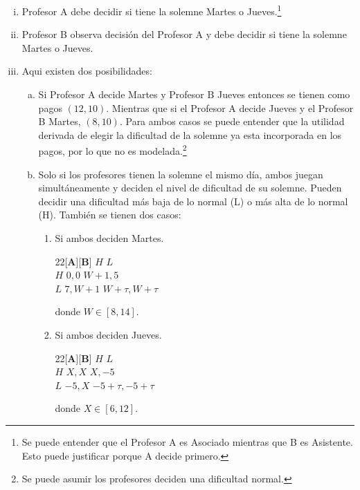 \documentclass[11pt]{article}
\begin{document}
\begin{enumerate}[(i)]
	\item Profesor A debe decidir si tiene la solemne Martes o Jueves.\footnote{Se puede entender que el Profesor A es Asociado mientras que B es Asistente. Esto puede justificar porque A decide primero.}
	\item Profesor B observa decisi\'on del Profesor A y debe decidir si tiene la solemne Martes o Jueves.
	\item Aqui existen dos posibilidades:
	\begin{enumerate}[(a)]
		\item Si Profesor A decide Martes y Profesor B Jueves entonces se tienen como pagos $(12,10)$. Mientras que si el Profesor A decide Jueves y el Profesor B Martes, $(8,10)$. Para ambos casos se puede entender que la utilidad derivada de elegir la dificultad de la solemne ya esta incorporada en los pagos, por lo que no es modelada.\footnote{Se puede asumir los profesores deciden una dificultad normal.}
		\item Solo si los profesores tienen la solemne el mismo d\'ia, ambos juegan simult\'aneamente y deciden el nivel de dificultad de su solemne. Pueden decidir una dificultad m\'as baja de lo normal (L) o m\'as alta de lo normal (H). Tambi\'en se tienen dos casos:
		\begin{enumerate}[{(iii, b)} (a)]
			\item Si ambos deciden Martes.
			\begin{center}
 				\begin{game}{2}{2}[\textbf{A}][\textbf{B}]
                  				\>$H$         \>$L$\\
        			$H$       \>$0,0$       \>$W+1,5$\\
        			$L$       \>$7,W+1$       \>$W+\tau,W+\tau$
				\end{game}
			\end{center} donde $W \in [8,14]$.
			\item Si ambos deciden Jueves.
			\begin{center}
 				\begin{game}{2}{2}[\textbf{A}][\textbf{B}]
                  				\>$H$         \>$L$\\
        			$H$       \>$X,X$       \>$X,-5$\\
        			$L$       \>$-5,X$       \>$-5+\tau,-5+\tau$
				\end{game} 
			\end{center} donde $X \in [6,12]$.
		\end{enumerate}
	\end{enumerate}
\end{enumerate}
\end{document}
